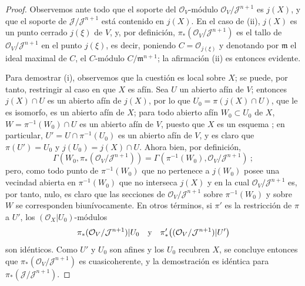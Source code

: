 \documentclass[oneside,10pt]{amsart}
\newcommand{\oldpage}[2][]{\marginnote{\normalfont\footnotesize\textbf{#1}~|~#2}\ignorespaces}
\begin{document}
\begin{proof}
Observemos ante todo que el soporte del $\mathcal{O}_V$-módulo $\mathcal{O}_V/\mathcal{J}^{n+1}$ es $j(X)$, y que el soporte de $\mathcal{J}/\mathcal{J}^{n+1}$ está contenido en $j(X)$.
En el caso de (ii), $j(X)$ es un punto cerrado $j(\xi)$ de $V$,
\oldpage[II]{185}
y, por definición, $\pi_*(\mathcal{O}_V/\mathcal{J}^{n+1})$ es el tallo de $\mathcal{O}_V/\mathcal{J}^{n+1}$ en el punto $j(\xi)$, es decir, poniendo $C=\mathcal{O}_{j(\xi)}$ y denotando por $\mathfrak{m}$ el ideal maximal de $C$, el $C$-módulo $C/\mathfrak{m}^{n+1}$;
la afirmación (ii) es entonces evidente.

Para demostrar (i), observemos que la cuestión es local sobre $X$;
se puede, por tanto, restringir al caso en que $X$ es afín.
Sea $U$ un abierto afín de $V$;
entonces $j(X)\cap U$ es un abierto afín de $j(X)$, por lo que $U_0=\pi(j(X)\cap U)$, que le es isomorfo, es un abierto afín de $X$;
para todo abierto afín $W_0\subset U_0$ de $X$, $W=\pi^{-1}(W_0)\cap U$ es un abierto afín de $V$, puesto que $X$ es un esquema ;
en particular, $U'=U\cap\pi^{-1}(U_0)$ es un abierto afín de $V$, y es claro que $\pi(U')=U_0$ y $j(U_0)=j(X)\cap U$.
Ahora bien, por definición,
\[
  \Gamma(W_0,\pi_*(\mathcal{O}_V/\mathcal{J}^{n+1}))
  =\Gamma(\pi^{-1}(W_0),\mathcal{O}_V/\mathcal{J}^{n+1})~;
\]
pero, como todo punto de $\pi^{-1}(W_0)$ que no pertenece a $j(W_0)$ posee una vecindad abierta en $\pi^{-1}(W_0)$ que no interseca $j(X)$ y en la cual $\mathcal{O}_V/\mathcal{J}^{n+1}$ es, por tanto, nulo, es claro que las secciones de $\mathcal{O}_V/\mathcal{J}^{n+1}$ sobre $\pi^{-1}(W_0)$ y sobre $W$ se corresponden biunívocamente.
En otros términos, si $\pi'$ es la restricción de $\pi$ a $U'$, los $(\mathcal{O}_X|U_0)$-módulos
\[
  \pi_*(\mathcal{O}_V/\mathcal{J}^{n+1})|U_0
  \quad\hbox{y}\quad
  \pi'_*\bigl((\mathcal{O}_V/\mathcal{J}^{n+1})|U'\bigr)
\]
son idénticos.
Como $U'$ y $U_0$ son afines y los $U_0$ recubren $X$, se concluye entonces  que $\pi_*(\mathcal{O}_V/\mathcal{J}^{n+1})$ es cuasicoherente, y la demostración es idéntica para $\pi_*(\mathcal{J}/\mathcal{J}^{n+1})$.


\end{proof}
\end{document}
